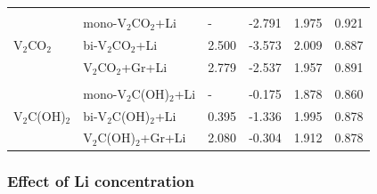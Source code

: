 \begin{table}[ht]
\begin{tabularx}{\textwidth}{XXXXXX}
              & & & & \\
\multirow{3}{*}{V$_2$CO$_2$}     &mono-V$_2$CO$_2$+Li                                              & -                        & -2.791                         & 1.975                     & 0.921                        \\
              &bi-V$_2$CO$_2$+Li                                                 & 2.500               & -3.573                         & 2.009                     & 0.887                        \\
              &V$_2$CO$_2$+Gr+Li                                                  & 2.779                  & -2.537                         & 1.957                     & 0.891                        \\ 
              & & & & \\
\multirow{3}{*}{V$_2$C(OH)$_2$}  &mono-V$_2$C(OH)$_2$+Li                                            & -                        & -0.175                         & 1.878                     & 0.860                       \\
              &bi-V$_2$C(OH)$_2$+Li                                                 & 0.395                   & -1.336                         & 1.995                     & 0.878                        \\
              &V$_2$C(OH)$_2$+Gr+Li                                                 & 2.080                  & -0.304                         & 1.912                     & 0.878  \\ \hline                     
\end{tabularx}
\end{table}


\subsubsection{Effect of Li concentration}

